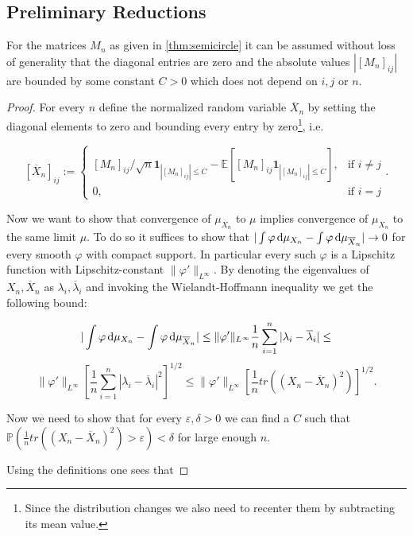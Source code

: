 \subsection{Preliminary Reductions}\label{ssec:prelimreduct}
\begin{lemma}
	For the matrices $M_n$ as given in \ref{thm:semicircle} it can be assumed without loss of generality that the diagonal entries are zero and the absolute values $|[M_n]_{ij}|$ are bounded by some constant $C>0$ which does not depend on $i,j$ or $n$.
\end{lemma}
\begin{proof}
	For every $n$ define the normalized random variable $\overline X_n$ by setting the diagonal elements to zero and bounding every entry by zero\footnote{Since the distribution changes we also need to recenter them by subtracting its mean value.}, i.e.

	$$[\overline X_n]_{ij}:=\begin{cases}
						[M_n]_{ij}/\sqrt n\mathbf 1_{|[M_n]_{ij}|\leq C}-\mathbb E\left[[M_n]_{ij}\mathbf 1_{|[M_n]_{ij}|\leq C}\right], &\mbox{if } i\neq j \\
						0, &\mbox{if } i=j
					  \end{cases}.$$
	
	Now we want to show that convergence of $\mu_{\overline X_n}$ to $\mu$ implies convergence of $\mu_{X_n}$ to the same limit $\mu$. To do so it suffices to show that $|\int\varphi\mathop{}\!\mathrm{d}\mu_{X_n}-\int\varphi\mathop{}\!\mathrm{d}\mu_{\overline X_n}|\rightarrow 0$ for every smooth $\varphi$ with compact support. In particular every such $\varphi$ is a Lipschitz function with Lipschitz-constant $\|\varphi'\|_{L^\infty}$. By denoting the eigenvalues of $X_n,\overline X_n$ as $\lambda_i,\overline\lambda_i$ and invoking the Wielandt-Hoffmann inequality we get the following bound:
	
	$$|\int\varphi\mathop{}\!\mathrm{d}\mu_{X_n}-\int\varphi\mathop{}\!\mathrm{d}\mu_{\overline X_n}| \leq
	\|\varphi'\|_{L^\infty}\frac{1}{n}\sum_{i=1}^n|\lambda_i-\overline\lambda_i| \leq$$
	$$
	\|\varphi'\|_{L^\infty}\left[\frac{1}{n}\sum_{i=1}^n|\lambda_i-\overline\lambda_i|^2\right]^{1/2} \leq
	\|\varphi'\|_{L^\infty}\left[\frac{1}{n}tr\left((X_n-\overline X_n)^2\right)\right]^{1/2}.$$
	
	Now we need to show that for every $\varepsilon,\delta > 0$ we can find a $C$ such that $\mathbb P\left(\frac{1}{n}tr\left((X_n-\overline X_n)^2\right)>\varepsilon\right)<\delta$ for large enough $n$.
	
	Using the definitions one sees that
	

\end{proof}
